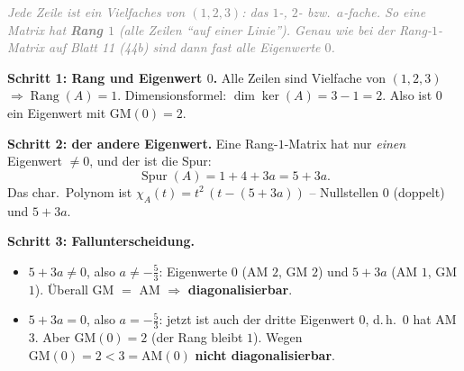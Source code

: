 \documentclass[a4paper,12pt]{article}
\begin{document}
\begin{center}
\end{center}

\textcolor{gray}{\small\textit{Jede Zeile ist ein Vielfaches von $(1,2,3)$: das $1$-, $2$- bzw.\ $a$-fache. So eine Matrix hat \textbf{Rang $1$} (alle Zeilen ``auf einer Linie''). Genau wie bei der Rang-$1$-Matrix auf Blatt 11 (44b) sind dann fast alle Eigenwerte $0$.}}

\textbf{Schritt 1: Rang und Eigenwert $0$.} Alle Zeilen sind Vielfache von $(1,2,3)$ $\Rightarrow \operatorname{Rang}(A) = 1$. Dimensionsformel: $\dim\ker(A) = 3 - 1 = 2$. Also ist $0$ ein Eigenwert mit $\text{GM}(0) = 2$.

\textbf{Schritt 2: der andere Eigenwert.} Eine Rang-$1$-Matrix hat nur \emph{einen} Eigenwert $\neq 0$, und der ist die Spur:
\[
\operatorname{Spur}(A) = 1 + 4 + 3a = 5 + 3a.
\]
Das char.\ Polynom ist $\chi_A(t) = t^2\,(t - (5+3a))$ -- Nullstellen $0$ (doppelt) und $5+3a$.

\textbf{Schritt 3: Fallunterscheidung.}
\begin{itemize}[leftmargin=*, nosep]
    \item \textbf{$5 + 3a \neq 0$}, also $a \neq -\tfrac{5}{3}$: Eigenwerte $0$ (AM $2$, GM $2$) und $5+3a$ (AM $1$, GM $1$). \"Uberall GM $=$ AM $\Rightarrow$ \textbf{diagonalisierbar}.
    \item \textbf{$5 + 3a = 0$}, also $a = -\tfrac{5}{3}$: jetzt ist auch der dritte Eigenwert $0$, d.\,h.\ $0$ hat AM $3$. Aber GM$(0) = 2$ (der Rang bleibt $1$). Wegen $\text{GM}(0) = 2 < 3 = \text{AM}(0)$ \textbf{nicht diagonalisierbar}.
\end{itemize}
\end{document}

